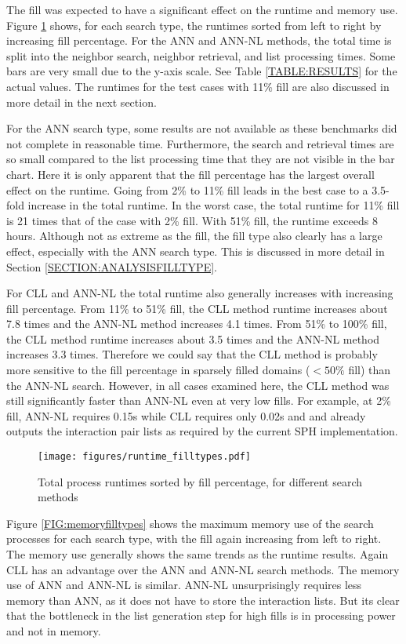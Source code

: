 The fill was expected to have a significant effect on the runtime and memory use. Figure \ref{FIG:runtimefilltypes} shows, for each search type, the runtimes sorted from left to right by increasing fill percentage. For the ANN and ANN-NL methods, the total time is split into the neighbor search, neighbor retrieval, and list processing times. Some bars are very small due to the y-axis scale. See Table \ref{TABLE:RESULTS} for the actual values. The runtimes for the test cases with 11\% fill are also discussed in more detail in the next section. 

For the ANN search type, some results are not available as these benchmarks did not complete in reasonable time. Furthermore, the search and retrieval times are so small compared to the list processing time that they are not visible in the bar chart. Here it is only apparent that the fill percentage has the largest overall effect on the runtime. Going from 2\% to 11\% fill leads in the best case to a 3.5-fold increase in the total runtime. In the worst case, the total runtime for 11\% fill is 21 times that of the case with 2\% fill. With 51\% fill, the runtime exceeds 8 hours. Although not as extreme as the fill, the fill type also clearly has a large effect, especially with the ANN search type. This is discussed in more detail in Section \ref{SECTION:ANALYSISFILLTYPE}.

For CLL and ANN-NL the total runtime also generally increases with increasing fill percentage. From 11\% to 51\% fill, the CLL method runtime increases about 7.8 times and the ANN-NL method increases 4.1 times. From 51\% to 100\% fill, the CLL method runtime increases about 3.5 times and the ANN-NL method increases 3.3 times. Therefore we could say that the CLL method is probably more sensitive to the fill percentage in sparsely filled domains ($< 50\%$ fill) than the ANN-NL search. However, in all cases examined here, the CLL method was still significantly faster than ANN-NL even at very low fills. For example, at 2\% fill, ANN-NL requires 0.15s while CLL requires only 0.02s and and already outputs the interaction pair lists as required by the current SPH implementation.

\begin{figure}[h]
	\centering
	\texttt{[image: figures/runtime\_filltypes.pdf]}
	\caption{Total process runtimes sorted by fill percentage, for different search methods} 
	\label{FIG:runtimefilltypes}
\end{figure}

Figure \ref{FIG:memoryfilltypes} shows the maximum memory use of the search processes for each search type, with the fill again increasing from left to right. The memory use generally shows the same trends as the runtime results. Again CLL has an advantage over the ANN and ANN-NL search methods. The memory use of ANN and ANN-NL is similar. ANN-NL unsurprisingly requires less memory than ANN, as it does not have to store the interaction lists. But its clear that the bottleneck in the list generation step for high fills is in processing power and not in memory.

